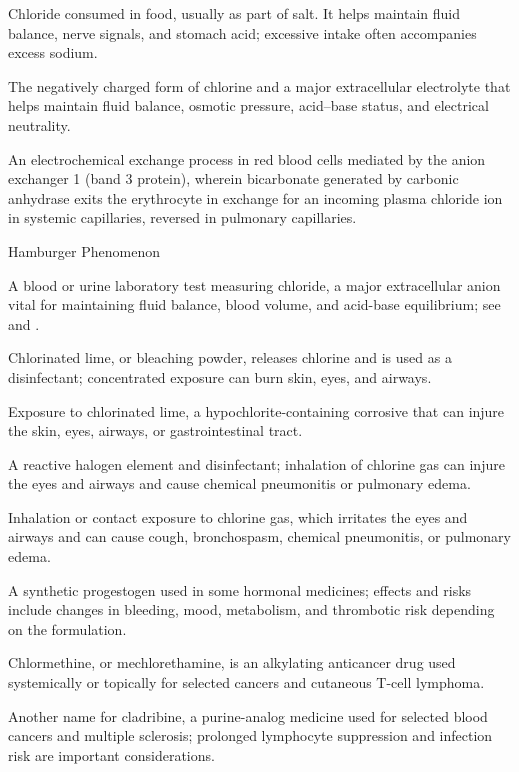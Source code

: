  Chloride consumed in food, usually as part of salt. It helps maintain fluid balance, nerve signals, and stomach acid; excessive intake often accompanies excess sodium.

 The negatively charged form of chlorine and a major extracellular electrolyte that helps maintain fluid balance, osmotic pressure, acid--base status, and electrical neutrality.

 An electrochemical exchange process in red blood cells mediated by the anion exchanger 1 (band 3 protein), wherein bicarbonate generated by carbonic anhydrase exits the erythrocyte in exchange for an incoming plasma chloride ion in systemic capillaries, reversed in pulmonary capillaries.

\synonyms
Hamburger Phenomenon

 A blood or urine laboratory test measuring chloride, a major extracellular anion vital for maintaining fluid balance, blood volume, and acid-base equilibrium; see  and .

 Chlorinated lime, or bleaching powder, releases chlorine and is used as a disinfectant; concentrated exposure can burn skin, eyes, and airways.

 Exposure to chlorinated lime, a hypochlorite-containing corrosive that can injure the skin, eyes, airways, or gastrointestinal tract.

 A reactive halogen element and disinfectant; inhalation of chlorine gas can injure the eyes and airways and cause chemical pneumonitis or pulmonary edema.

 Inhalation or contact exposure to chlorine gas, which irritates the eyes and airways and can cause cough, bronchospasm, chemical pneumonitis, or pulmonary edema.

 A synthetic progestogen used in some hormonal medicines; effects and risks include changes in bleeding, mood, metabolism, and thrombotic risk depending on the formulation.

 Chlormethine, or mechlorethamine, is an alkylating anticancer drug used systemically or topically for selected cancers and cutaneous T-cell lymphoma.

 Another name for cladribine, a purine-analog medicine used for selected blood cancers and multiple sclerosis; prolonged lymphocyte suppression and infection risk are important considerations.

